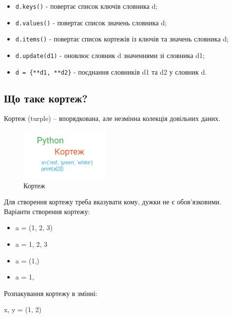 \begin{frame}
    \begin{itemize}
        \item<1-> \texttt{d.keys()} - повертає список ключів словника d;
        \item<1-> \texttt{d.values()} - повертає список значень словника d;
        \item<1-> \texttt{d.items()} - повертає список кортежів із ключів та значень словника d;
        \item<2-> \texttt{d.update(d1)} - оновлює словник d значеннями зі словника d1;
        \item<3-> \texttt{d = \{**d1, **d2\}} - поєднання словників d1 та d2 у словник d.
    \end{itemize}
\end{frame}


 \subsection{Що таке кортеж?} 
\begin{frame}
Кортеж (turple) – впорядкована, але незмінна колекція довільних даних.

\begin{figure}
\begin{center}
 \includegraphics[width=0.4\textwidth]{pictures/turple.png}
\caption{Кортеж}
\label{turple} 
\end{center}
\end{figure}

\end{frame}

\begin{frame}
Для створення кортежу треба вказувати кому, дужки не є обов'язковими. Варіанти створення кортежу:

\begin{itemize}
  \item a = (1, 2, 3)
  \item a = 1, 2, 3
  \item a = (1,)
  \item a = 1,
\end{itemize}

Розпакування кортежу в змінні:

x, y = (1, 2)
\end{frame}

